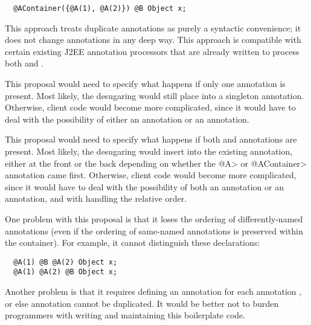 \documentclass[10pt]{article}
\begin{document}
\begin{Verbatim}
  @AContainer({@A(1), @A(2)}) @B Object x;
\end{Verbatim}

This approach treats duplicate annotations as purely a syntactic
convenience; it does not change annotations in any deep way.  This approach
is compatible with certain existing J2EE annotation processors that are
already written to process both  and .

This proposal would need to specify what happens if only one 
annotation is present.  Most likely, the desugaring
would still place  into a singleton  annotation.
Otherwise, client code would become more complicated, since it would have
to deal with the possibility of either an  annotation or an
 annotation.

This proposal would need to specify what happens if both  and
 annotations are present.  Most likely, the desugaring
would insert  into the existing  annotation,
either at the front or the back depending on whether the \<@A> or
\<@AContainer> annotation came first.
Otherwise, client code would become more complicated, since it would have
to deal with the possibility of both an  annotation or an
 annotation, and with handling the relative order.

One problem with this proposal is that it loses the ordering of
differently-named annotations (even if the ordering of same-named
annotations is preserved within the container).  For example, it cannot
distinguish these
declarations:
\begin{Verbatim}
  @A(1) @B @A(2) Object x;
  @A(1) @A(2) @B Object x;
\end{Verbatim}

Another problem is that it requires defining an 
annotation for each annotation , or else annotation 
cannot be duplicated.  It would be better not to burden programmers with
writing and maintaining this boilerplate code.
\end{document}
